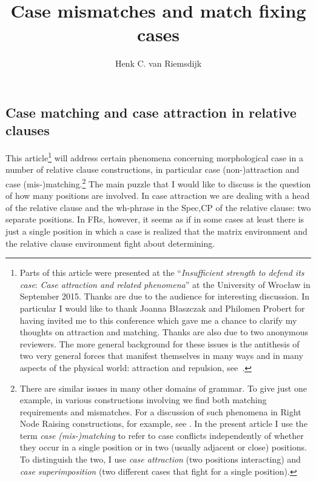 \documentclass[output=paper]{langsci/langscibook}
\author{Henk C. van Riemsdijk\affiliation{Tilburg University}}
\title{Case mismatches and match fixing cases}
\begin{document}
\glsresetall
\maketitle
\begin{refcontext}

\section{Case matching and case attraction in relative clauses}

This article\footnote{Parts of this article were presented at the
    \enquote{\emph{Insufficient strength to defend its case}: \emph{Case
    attraction and related phenomena}} at the University of Wrocław in
    September 2015. Thanks are due to the audience for interesting discussion.
    In particular I would like to thank  Joanna Błaszczak and Philomen Probert
    for having invited me to this conference which gave me a chance to clarify
    my thoughts on attraction and matching. Thanks are also due to two
    anonymous reviewers.  The more general background for these issues is the
    antithesis of two very general forces that manifest themselves in many ways
    and in many aspects of the physical world: attraction and repulsion,
    see~\textcite{VanRiemsdijk2019}.} will address certain phenomena concerning
    morphological case in a number of relative clause constructions, in
    particular case (non-)attraction and case (mis-)matching.\footnote{There
        are similar issues in many other domains of grammar. To give just one
        example, in various constructions involving  we find both
        matching requirements and mismatches. For a discussion of such
        phenomena in Right Node Raising constructions, for example, see
        \citet{Larson2012}. In the present article I use the term \emph{case
        (mis-)matching} to refer to case conflicts independently of whether
        they occur in a single position or in two (usually adjacent or close)
        positions. To distinguish the two, I use \emph{case attraction} (two
    positions interacting) and \emph{case superimposition} (two different cases
that fight for a single position).} The main puzzle that I would like to
discuss is the question of how many positions are involved. In case attraction
we are dealing with a head of the relative clause and the wh-phrase in the
Spec,CP of the relative clause: two separate positions. In \glspl{FR}, however,
it seems as if in some cases at least there is just a single position in which
a case is realized that the matrix environment and the relative clause
environment fight about determining.


\end{refcontext}
\end{document}
